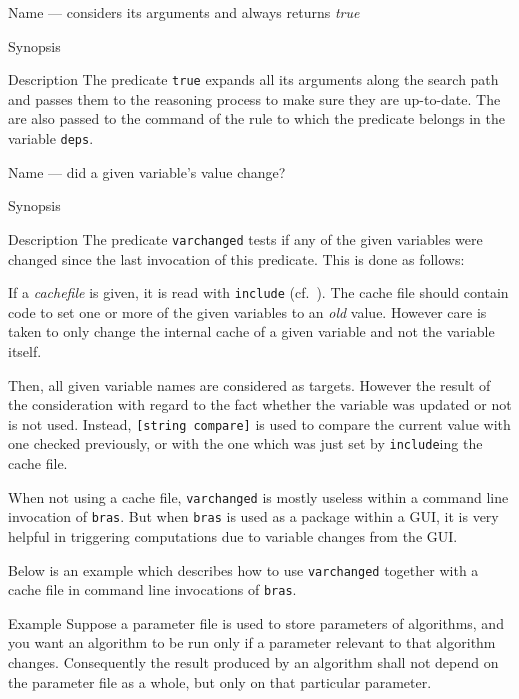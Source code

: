 \documentclass[11pt]{scrartcl}
\newcommand{\bras}{\texttt{bras}}
\begin{document}
\begin{Describe}
\item[Name]  --- considers its arguments and always
  returns \textit{true}
\item[Synopsis]  
\item[Description] The predicate \texttt{true} expands all its
  arguments along the search path and passes them to the reasoning
  process to make sure they are up-to-date. The are also passed to the
  command of the rule to which the predicate belongs in the variable
  \texttt{deps}.
\end{Describe}

\begin{Describe}
\item[Name]  --- did a given variable's value
  change?
\item[Synopsis]   
\item[Description] The predicate \texttt{varchanged} tests if any of
  the given variables were changed since the last invocation of 
  this predicate. This is done as follows:
  
  If a \textit{cachefile} is given, it is read with
  \texttt{include} (cf.~\pageref{proc:include}). The cache file should 
  contain code to set one or more of the given variables to an
  \textit{old} value. However care is taken to only change the
  internal cache of a given variable and not the variable itself.
  
  Then, all given variable names are considered as targets. However the
  result of the consideration with regard to the fact whether the
  variable was updated or not is not used. Instead,
  \verb+[+\texttt{string compare}\verb+]+ is used to compare the
  current value with one checked previously, or with the one which was 
  just set by \texttt{include}ing the cache file.
  
  When not using a cache file, \texttt{varchanged} is mostly useless
  within a command line invocation of \bras{}. But when \bras{} is
  used as a package within a GUI, it is very helpful in triggering
  computations due to variable changes from the GUI.
  
  Below is an example which describes how to use \texttt{varchanged}
  together with a cache file in command line invocations of \bras.

\item[Example]
  Suppose a parameter file is used to store parameters of
  algorithms, and you want an algorithm to be run only if a parameter
  relevant to that algorithm changes. Consequently the result produced by 
  an algorithm shall not depend on the parameter file as a whole, but
  only on that particular parameter.


\end{Describe}
\end{document}
